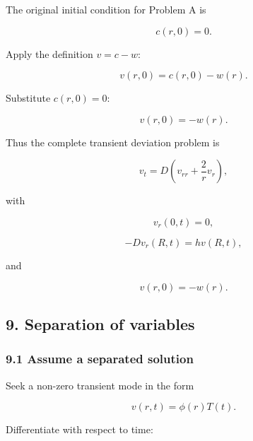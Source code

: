 \documentclass[11pt,a4paper]{article}
\begin{document}
The original initial condition for Problem A is

\begin{equation}
c(r,0)=0.
\tag{TRISO-ANA-226}
\label{eq:triso-ana-226}
\end{equation}

Apply the definition $v=c-w$:

\begin{equation}
v(r,0)=c(r,0)-w(r).
\tag{TRISO-ANA-227}
\label{eq:triso-ana-227}
\end{equation}

Substitute $c(r,0)=0$:

\begin{equation}
\boxed{
v(r,0)=-w(r).
}
\tag{TRISO-ANA-228}
\label{eq:triso-ana-228}
\end{equation}

Thus the complete transient deviation problem is

\begin{equation}
v_t
=
D
\left(
v_{rr}+\frac2r v_r
\right),
\end{equation}

with

\begin{equation}
v_r(0,t)=0,
\end{equation}

\begin{equation}
-Dv_r(R,t)=hv(R,t),
\end{equation}

and

\begin{equation}
v(r,0)=-w(r).
\end{equation}

\subsection*{9. Separation of variables}

\subsubsection*{9.1 Assume a separated solution}

Seek a non-zero transient mode in the form

\begin{equation}
v(r,t)=\phi(r)T(t).
\tag{TRISO-ANA-229}
\label{eq:triso-ana-229}
\end{equation}

Differentiate with respect to time:
\end{document}
